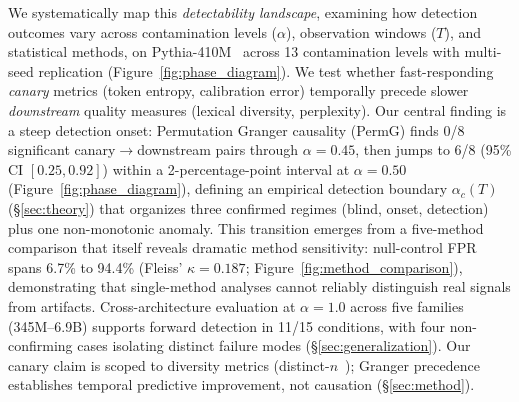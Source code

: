 We systematically map this \emph{detectability landscape}, examining how detection outcomes vary across contamination levels ($\alpha$), observation windows ($T$), and statistical methods, on Pythia-410M~\citep{biderman2023pythia} across 13 contamination levels with multi-seed replication (Figure~\ref{fig:phase_diagram}).
We test whether fast-responding \emph{canary} metrics (token entropy, calibration error) temporally precede slower \emph{downstream} quality measures (lexical diversity, perplexity).
Our central finding is a steep detection onset: Permutation Granger causality (PermG) finds 0/8 significant canary$\to$downstream pairs through $\alpha{=}0.45$, then jumps to 6/8 (95\% CI $[0.25, 0.92]$) within a 2-percentage-point interval at $\alpha{=}0.50$ (Figure~\ref{fig:phase_diagram}), defining an empirical detection boundary $\alpha_c(T)$ (\S\ref{sec:theory}) that organizes three confirmed regimes (blind, onset, detection) plus one non-monotonic anomaly.
This transition emerges from a five-method comparison that itself reveals dramatic method sensitivity: null-control FPR spans 6.7\% to 94.4\% (Fleiss' $\kappa{=}0.187$; Figure~\ref{fig:method_comparison}), demonstrating that single-method analyses cannot reliably distinguish real signals from artifacts.
Cross-architecture evaluation at $\alpha{=}1.0$ across five families (345M--6.9B) supports forward detection in 11/15 conditions, with four non-confirming cases isolating distinct failure modes (\S\ref{sec:generalization}).
Our canary claim is scoped to diversity metrics (distinct-$n$~\citep{li2016diversity}); Granger precedence establishes temporal predictive improvement, not causation (\S\ref{sec:method}).

